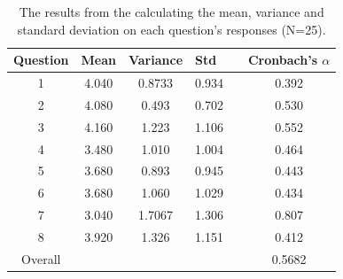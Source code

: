 \begin{table}[H]
\centering
\caption{The results from the calculating the mean, variance and standard deviation on each question's responses (N=25).}
\label{table:questionsCalc}
\begin{tabular}{@{}cccclc@{}}
\toprule
\multicolumn{1}{l}{Question} & \multicolumn{1}{l}{Mean} & \multicolumn{1}{l}{Variance} & \multicolumn{1}{l}{Std} &  & \multicolumn{1}{l}{Cronbach's $\alpha$} \\ \midrule
1                            & 4.040                    & 0.8733                       & 0.934                   &  & 0.392                              \\
2                            & 4.080                    & 0.493                        & 0.702                   &  & 0.530                              \\
3                            & 4.160                    & 1.223                        & 1.106                   &  & 0.552                              \\
4                            & 3.480                    & 1.010                        & 1.004                   &  & 0.464                              \\
5                            & 3.680                    & 0.893                        & 0.945                   &  & 0.443                              \\
6                            & 3.680                    & 1.060                        & 1.029                   &  & 0.434                              \\
7                            & 3.040                    & 1.7067                       & 1.306                   &  & 0.807                              \\
8                            & 3.920                    & 1.326                        & 1.151                   &  & 0.412                              \\ \midrule
Overall                        & \multicolumn{1}{l}{}     & \multicolumn{1}{l}{}         & \multicolumn{1}{l}{}    &  & 0.5682                             \\ \bottomrule
\end{tabular}
\end{table}

